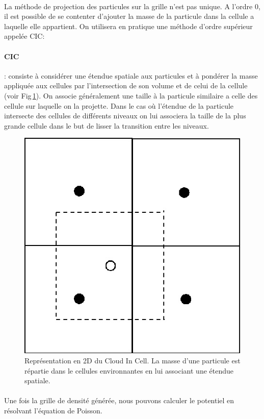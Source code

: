 \paragraph{}
La méthode de projection des particules sur la grille n'est pas unique.
A l'ordre $0$, il est possible de se contenter d'ajouter la masse de la particule dans la cellule a laquelle elle appartient.
On utilisera en pratique une méthode d'ordre supérieur appelée \ac{CIC}:

\paragraph{CIC} : consiste à considérer une étendue spatiale aux particules et à pondérer la masse appliquée aux cellules par l'intersection de son volume et de celui de la cellule (voir Fig\,\ref{fig:CIC}).
On associe généralement une taille à la particule similaire a celle des cellule sur laquelle on la projette.
Dans le cas où l’étendue de la particule intersecte des cellules de différents niveaux on lui associera la taille de la plus grande cellule dans le but de lisser la transition entre les niveaux.

\begin{figure}[bth]
		\centering
        \includegraphics[width=.5\linewidth]{img/02/CIC.jpg} 
        \caption{Représentation en 2D du Cloud In Cell. 
        La masse d'une particule est répartie dans le cellules environnantes en lui associant une étendue spatiale.
}
 		\label{fig:CIC}
\end{figure}

\paragraph{}
Une fois la grille de densité générée, nous pouvons calculer le potentiel en résolvant l'équation de Poisson.

